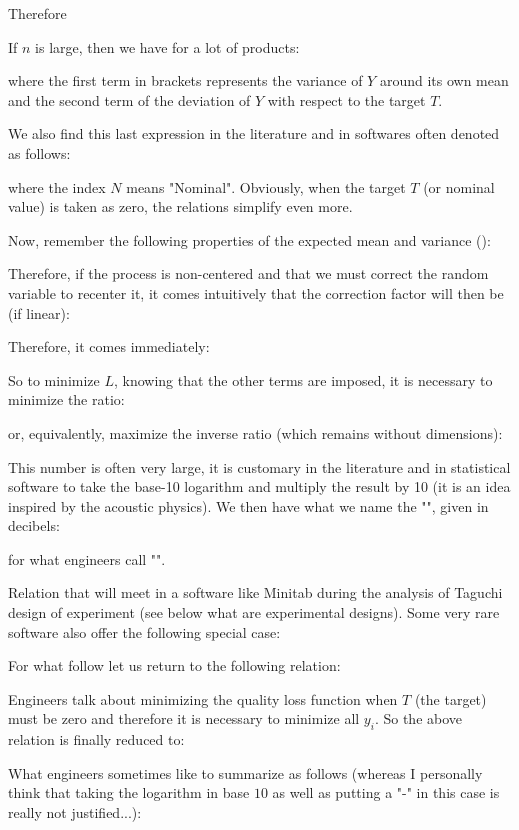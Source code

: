 	Therefore
	
	If $n$ is large, then we have for a lot of products:
	
	where the first term in brackets represents the variance of $Y$ around its own mean and the second term of the deviation of $Y$ with respect to the target $T$.
	
	We also find this last expression in the literature and in softwares often denoted as follows:
	
	where the index $N$ means "Nominal". Obviously, when the target $T$ (or nominal value) is taken as zero, the relations simplify even more.
	
	Now, remember the following properties of the expected mean and variance ():
	
	Therefore, if the process is non-centered and that we must correct the random variable to recenter it, it comes intuitively that the correction factor will then be (if linear):
	
	Therefore, it comes immediately:
	
	So to minimize $L$, knowing that the other terms are imposed, it is necessary to minimize the ratio:
	
	or, equivalently, maximize the inverse ratio (which remains without dimensions):
	
	This number is often very large, it is customary in the literature and in statistical software to take the base-10 logarithm and multiply the result by 10 (it is an idea inspired by the acoustic physics). We then have what we name the "", given in decibels:
	
	for what engineers call "".
	
	Relation that will meet in a software like Minitab during the analysis of Taguchi design of experiment (see below what are experimental designs). Some very rare software also offer the following special case:
	
	For what follow let us return to the following relation:
	
	Engineers talk about minimizing the quality loss function when $T$ (the target) must be zero and therefore it is necessary to minimize all $y_i$. So the above relation is finally reduced to:
	
	What engineers sometimes like to summarize as follows (whereas I personally think that taking the logarithm in base $10$ as well as putting a "-" in this case is really not justified...):
	
